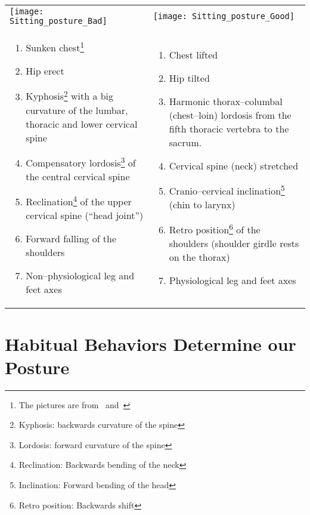 \documentclass[../main.tex]{subfiles}
\begin{document}
\begin{minipage}{\textwidth}
\begin{tabular}{p{6.3cm}p{6.3cm}}
  \texttt{[image: Sitting\_posture\_Bad]} &

\texttt{[image: Sitting\_posture\_Good]} \\

  \begin{enumerate}
\item {Sunken chest}\footnote{The pictures are from~\cite{Haltung} and~\cite{Darmreinig}}
\item Hip erect
\item Kyphosis\footnote{Kyphosis: backwards curvature of the spine} with a big {curvature} of the lumbar, thoracic and lower cervical {spine}
\item Compensatory lordosis\footnote{Lordosis: forward curvature of the spine}
  of the central cervical spine
\item Reclination\footnote{Reclination: Backwards bending of the neck}
  of the upper cervical spine (``head joint'')
\item {Forward falling of the shoulders}
\item Non--physiological leg and feet axes
    \end{enumerate} &

  \begin{enumerate}
\item {Chest lifted}
\item Hip tilted
\item Harmonic thorax--columbal (chest--loin) {lordosis} from the fifth thoracic vertebra to the sacrum.
\item Cervical spine (neck) stretched
\item Cranio--cervical inclination\footnote{Inclination: Forward bending of the head} ({chin to larynx})
\item Retro position\footnote{Retro position: Backwards shift} of the shoulders ({shoulder girdle rests on the thorax})
\item Physiological leg and feet axes

    \end{enumerate}
\\
  
  \end{tabular}
\end{minipage}

\newpage
\section{Habitual Behaviors Determine our Posture}
\end{document}
